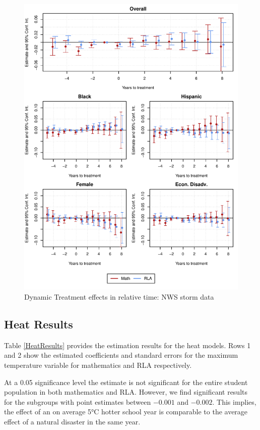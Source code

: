 \begin{figure}[!h]
	\centering
	\includegraphics[scale=1]{"../Code & Data/ResultsPlotStorm.pdf"}
	\caption{Dynamic Treatment effects in relative time: NWS storm data}
	\label{ResultsPlotStorm}
\end{figure}


\subsection{Heat Results}

Table \ref{HeatResults} provides the estimation results for the heat models. Rows 1 and 2 show the estimated coefficients and standard errors for the maximum temperature variable for mathematics and RLA respectively.

At a 0.05 significance level the estimate is not significant for the entire student population in both mathematics and RLA. However, we find significant results for the subgroups with point estimates between $-0.001$ and $-0.002$. This implies, the effect of an on average 5°C hotter school year is comparable to the average effect of a natural disaster in the same year.

